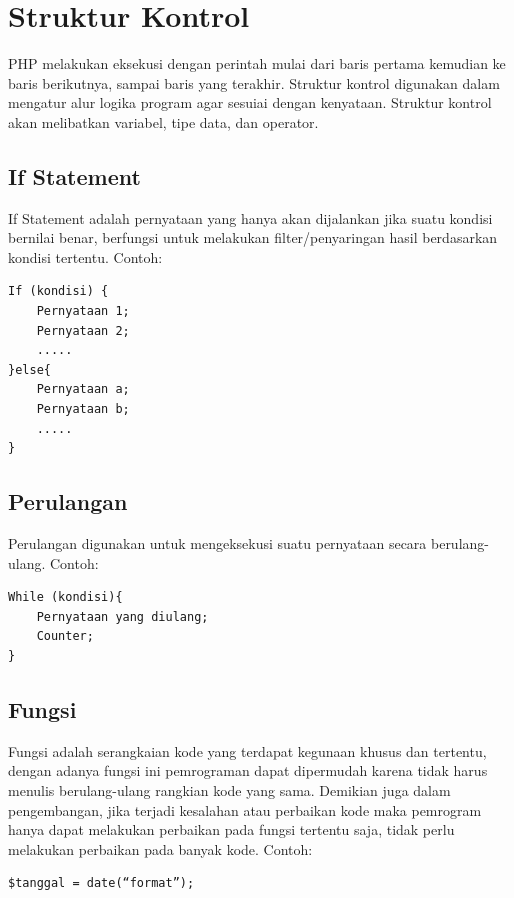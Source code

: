 \section{Struktur Kontrol}
PHP melakukan eksekusi dengan perintah mulai dari baris pertama kemudian ke baris berikutnya, sampai baris yang terakhir. Struktur kontrol digunakan dalam mengatur alur logika program agar sesuiai dengan kenyataan. Struktur kontrol akan melibatkan variabel, tipe data, dan operator. 
\subsection{If Statement}
If Statement  adalah pernyataan yang hanya akan dijalankan jika suatu kondisi bernilai benar, berfungsi untuk melakukan filter/penyaringan hasil berdasarkan kondisi tertentu. Contoh:
\begin{lstlisting}
If (kondisi) {
    Pernyataan 1;
    Pernyataan 2;
    .....
}else{
    Pernyataan a;
    Pernyataan b;
    .....
}
\end{lstlisting}
\subsection{Perulangan}
Perulangan digunakan untuk mengeksekusi suatu pernyataan secara berulang-ulang. Contoh:
\begin{lstlisting}
While (kondisi){
    Pernyataan yang diulang;
    Counter;
}
\end{lstlisting}
\subsection{Fungsi}
Fungsi adalah serangkaian kode yang terdapat kegunaan khusus dan tertentu, dengan adanya fungsi ini pemrograman dapat dipermudah karena tidak harus menulis berulang-ulang rangkian kode yang sama. Demikian juga dalam pengembangan, jika terjadi kesalahan atau perbaikan kode maka pemrogram hanya dapat melakukan perbaikan pada fungsi tertentu saja, tidak perlu melakukan perbaikan pada banyak kode. Contoh:
\begin{lstlisting}
$tanggal = date(“format”);
\end{lstlisting}
